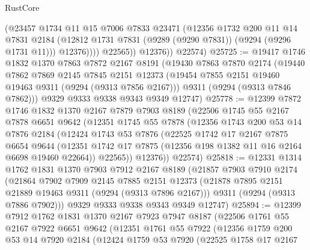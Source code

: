 \begin{lexlean}{RustCore}
\begin{coremodule}
                  (@23457
                    @1734
                    @11
                    @15
                    @7006
                    @7833
                    @23471
                    (@12356
                      @1732
                      @200
                      @11
                      @14
                      @7831
                      @2184
                      (@12812 @1731 @7831 (@9289 (@9290 @7831)) (@9294 (@9296 @1731 @11)))
                      @12376))))
              @22565))
          @12376))
      @22574)
@25725 := @19417
    @1746
    @1832
    @1370
    @7863
    @7872
    @2167
    @8191
    (@19430
      @7863
      @7870
      @2174
      (@19440
        @7862
        @7869
        @2145
        @7845
        @2151
        @12373
        (@19454 @7855 @2151 @19460 @19463 @9311 (@9294 (@9313 @7856 @2167)))
        @9311
        (@9294 (@9313 @7846 @7862)))
      @9329
      @9333
      @9338
      @9343
      @9349
      @12747)
@25778 := @12399
    @7872
    @1746
    @1832
    @1370
    @2167
    @7879
    @7903
    @8189
    (@22506
      @1745
      @55
      @2167
      @7878
      @6651
      @9642
      (@12351
        @1745
        @55
        @7878
        (@12356
          @1743
          @200
          @53
          @14
          @7876
          @2184
          (@12424
            @1743
            @53
            @7876
            (@22525
              @1742
              @17
              @2167
              @7875
              @6654
              @9644
              (@12351 @1742 @17 @7875 (@12356 @198 @1382 @11 @16 @2164 @6698 @19460 @22664))
              @22565))
          @12376))
      @22574)
@25818 := @12331
    @1314
    @1762
    @1831
    @1370
    @7903
    @7912
    @2167
    @8189
    (@21857
      @7903
      @7910
      @2174
      (@21864
        @7902
        @7909
        @2145
        @7885
        @2151
        @12373
        (@21878 @7895 @2151 @21889 @19463 @9311 (@9294 (@9313 @7896 @2167)))
        @9311
        (@9294 (@9313 @7886 @7902)))
      @9329
      @9333
      @9338
      @9343
      @9349
      @12747)
@25894 := @12399
    @7912
    @1762
    @1831
    @1370
    @2167
    @7923
    @7947
    @8187
    (@22506
      @1761
      @55
      @2167
      @7922
      @6651
      @9642
      (@12351
        @1761
        @55
        @7922
        (@12356
          @1759
          @200
          @53
          @14
          @7920
          @2184
          (@12424
            @1759
            @53
            @7920
            (@22525
              @1758
              @17
              @2167

\end{coremodule}
\end{lexlean}
